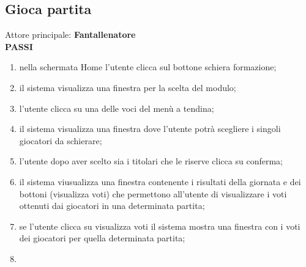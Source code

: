 \documentclass[12pt,a4paper]{article}
\begin{document}
\subsection{Gioca partita}
Attore principale: \textbf{Fantallenatore}\\
\newline
\textbf{PASSI}
\begin{enumerate}
\item nella schermata Home l'utente clicca sul bottone schiera formazione;
\item il sistema visualizza una finestra per la scelta del modulo;
\item l'utente clicca su una delle voci del menù a tendina;
\item il sistema visualizza una finestra dove l'utente potrà scegliere i singoli giocatori da schierare;
\item l'utente dopo aver scelto sia i titolari che le riserve clicca su conferma;
\item il sistema viusualizza una finestra contenente i risultati della giornata e dei bottoni (visualizza voti) che permettono all'utente di visualizzare i voti ottenuti dai giocatori in una determinata partita;
\item se l'utente clicca su visualizza voti il sistema mostra una finestra con i voti dei giocatori per quella determinata partita;
\item 
\end{enumerate}
\end{document}
